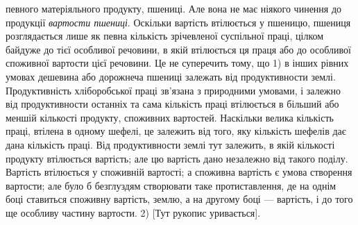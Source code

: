 \parcont{}  %
певного матеріяльного продукту, пшениці. Але вона не має ніякого чинення до продукції
\emph{вартости пшениці}. Оскільки вартість втілюється у пшеницю, пшениця
розглядається лише як певна кількість зрічевленої суспільної праці, цілком
байдуже до тієї особливої речовини, в якій втілюється ця праця або до особливої
споживної вартости цієї речовини. Це не суперечить тому, що 1) в інших рівних
умовах дешевина або дорожнеча пшениці залежать від продуктивности землі. Продуктивність
хліборобської праці зв’язана з природними умовами, і залежно від продуктивности
останніх та сама кількість праці втілюється в більший або меншій кількості
продукту, споживних вартостей. Наскільки велика кількість праці, втілена в
одному шефелі, це залежить від того, яку кількість шефелів дає дана кількість праці.
Від продуктивности землі тут залежить, в якій кількості продукту втілюється вартість;
але цю вартість дано незалежно від такого поділу. Вартість втілюється
у споживній вартості; а споживна вартість є умова створення вартости; але
було б безглуздям створювати таке протиставлення, де на однім боці ставиться
споживну вартість, землю, а на другому боці — вартість, і до того ще особливу
частину вартости. 2) [Тут рукопис уривається].

\subsubsection{}

